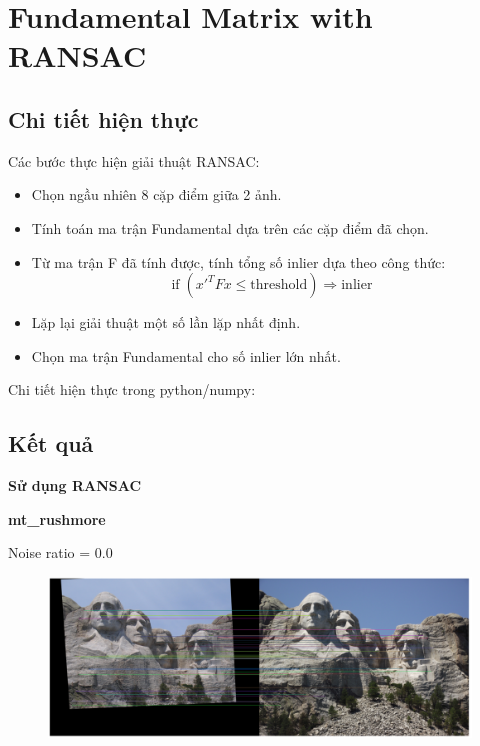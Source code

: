 \documentclass[11pt]{article}
\begin{document}
\section*{Fundamental Matrix with RANSAC}
\subsection*{Chi tiết hiện thực}
Các bước thực hiện giải thuật RANSAC:
\begin{itemize}
    \item Chọn ngầu nhiên 8 cặp điểm giữa 2 ảnh.
    \item Tính toán ma trận Fundamental dựa trên các cặp điểm đã chọn.
    \item Từ ma trận F đã tính được, tính tổng số inlier dựa theo công thức:
        \begin{equation*}
            \text{if} \; (x'^T F x \leq \text{threshold}) \Rightarrow \text{inlier}
        \end{equation*}
    \item Lặp lại giải thuật một số lần lặp nhất định.
    \item Chọn ma trận Fundamental cho số inlier lớn nhất.
\end{itemize}

Chi tiết hiện thực trong python/numpy:

\subsection*{Kết quả}
\textbf{Sử dụng RANSAC}

\textbf{mt\_rushmore}


Noise ratio = 0.0
\begin{figure}[H]
    \centering
    \includegraphics[width=14cm]{images/part3/ransac_image_1_noise_0.0_1.png}
\end{figure}
\end{document}
